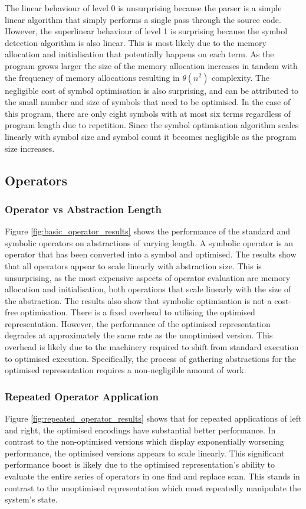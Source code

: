The linear behaviour of level 0 is unsurprising because the parser is a simple linear algorithm that simply performs a single pass through the source code. However, the superlinear behaviour of level 1 is surprising because the symbol detection algorithm is also linear. This is most likely due to the memory allocation and initialisation that potentially happens on each term. As the program grows larger the size of the memory allocation increases in tandem with the frequency of memory allocations resulting in $\theta(n^2)$ complexity. The negligible cost of symbol optimisation is also surprising, and can be attributed to the small number and size of symbols that need to be optimised. In the case of this program, there are only eight symbols with at most six terms regardless of program length due to repetition. Since the symbol optimisation algorithm scales linearly with symbol size and symbol count it becomes negligible as the program size increases.

\subsection{Operators}
\subsubsection{Operator vs Abstraction Length}

Figure \ref{fig:basic_operator_results} shows the performance of the standard and symbolic operators on abstractions of varying length. A symbolic operator is an operator that has been converted into a symbol and optimised. The results show that all operators appear to scale linearly with abstraction size. This is unsurprising, as the most expensive aspects of operator evaluation are memory allocation and initialisation, both operations that scale linearly with the size of the abstraction. The results also show that symbolic optimisation is not a cost-free optimisation. There is a fixed overhead to utilising the optimised representation. However, the performance of the optimised representation degrades at approximately the same rate as the unoptimised version. This overhead is likely due to the machinery required to shift from standard execution to optimised execution. Specifically, the process of gathering abstractions for the optimised representation requires a non-negligible amount of work.

\subsubsection{Repeated Operator Application}

Figure \ref{fig:repeated_operator_results} shows that for repeated applications of left and right, the optimised encodings have substantial better performance. In contrast to the non-optimised versions which display exponentially worsening performance, the optimised versions appears to scale linearly. This significant performance boost is likely due to the optimised representation's ability to evaluate the entire series of operators in one find and replace scan. This stands in contrast to the unoptimised representation which must repeatedly manipulate the system's state.

